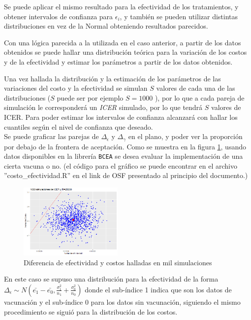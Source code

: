 \documentclass{siep}
\begin{document}
Se puede aplicar el mismo resultado para la efectividad de los tratamientos, y obtener intervalos de confianza para $\epsilon_i$, y también se pueden utilizar distintas distribuciones en vez de la Normal obteniendo resultados parecidos.


Con una lógica parecida a la utilizada en el caso anterior, a partir de los datos obtenidos se puede hallar una distribución teórica para la variación de los costos y de la efectividad y estimar los parámetros a partir de los datos obtenidos. 

Una vez hallada la distribución y la estimación de los par\'ametros de las variaciones del costo y la efectividad se simulan $S$ valores de cada una de las distribuciones ($S$ puede ser por ejemplo $S = 1000$ ), por lo que a cada pareja de simulación le corresponderá un \textit{ICER} simulado, por lo que tendr\'a $S$ valores de ICER. Para poder estimar los intervalos de confianza alcanzará con hallar los cuantiles según el nivel de confianza que deseado.\\

Se puede graficar las parejas de $\Delta_\epsilon$ y $\Delta_\gamma$ en el plano, y poder ver la proporción por debajo de la frontera de aceptación. Como se muestra en la figura \ref{fig:3}, usando datos disponibles en la librería \texttt{BCEA} se desea evaluar la implementación de una cierta vacuna o no. (el código para el gráfico se puede encontrar en el archivo ''costo\_efectividad.R'' en el link de OSF presentado al principio del documento.)\\

\begin{figure}[htbp]
	\centering
	\includegraphics[width=0.45\textwidth]{grafi/mil_sims.png}
	\caption{Diferencia de efectividad y costos halladas en mil simulaciones} 
	\label{fig:3}   
\end{figure}

En este caso se supuso una distribución para la efectividad de la forma $\Delta_\epsilon \sim N(\bar{e_1}-\bar{e_0},\frac{\sigma_1^2}{n_1}+\frac{\sigma_0^2}{n_0})$ donde el sub-índice 1 indica que son los datos de vacunación y el sub-índice 0 para los datos sin vacunación, siguiendo el mismo procedimiento se siguió para la distribución de los costos.\\
\end{document}
